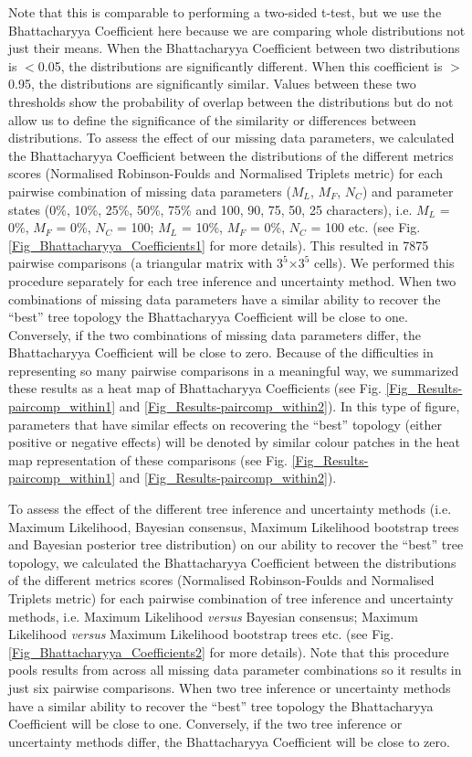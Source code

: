 Note that this is comparable to performing a two-sided t-test, but we use the Bhattacharyya Coefficient here because we are comparing whole distributions not just their means.
When the Bhattacharyya Coefficient between two distributions is $<$0.05, the distributions are significantly different.
When this coefficient is $>$0.95, the distributions are significantly similar.
Values between these two thresholds show the probability of overlap between the distributions but do not allow us to define the significance of the similarity or differences between distributions.
To assess the effect of our missing data parameters, we calculated the Bhattacharyya Coefficient between the distributions of the different metrics scores (Normalised Robinson-Foulds and Normalised Triplets metric) for each pairwise combination of missing data parameters ($M_{L}$, $M_{F}$, $N_{C}$) and parameter states (0\%, 10\%, 25\%, 50\%, 75\% and 100, 90, 75, 50, 25 characters), i.e. $M_{L}$ = 0\%, $M_{F}$ = 0\%, $N_{C}$ = 100; $M_{L}$ = 10\%, $M_{F}$ = 0\%, $N_{C}$ = 100 etc. (see Fig. \ref{Fig_Bhattacharyya_Coefficients1} for more details).
This resulted in 7875 pairwise comparisons (a triangular matrix with $3^5$$\times$$3^5$ cells).
We performed this procedure separately for each tree inference and uncertainty method.
When two combinations of missing data parameters have a similar ability to recover the ``best'' tree topology the Bhattacharyya Coefficient will be close to one.
Conversely, if the two combinations of missing data parameters differ, the Bhattacharyya Coefficient will be close to zero.
Because of the difficulties in representing so many pairwise comparisons in a meaningful way, we summarized these results as a heat map of Bhattacharyya Coefficients (see Fig. \ref{Fig_Results-paircomp_within1} and \ref{Fig_Results-paircomp_within2}).
In this type of figure, parameters that have similar effects on recovering the ``best'' topology (either positive or negative effects) will be denoted by similar colour patches in the heat map representation of these comparisons (see Fig. \ref{Fig_Results-paircomp_within1} and \ref{Fig_Results-paircomp_within2}).

To assess the effect of the different tree inference and uncertainty methods (i.e. Maximum Likelihood, Bayesian consensus, Maximum Likelihood bootstrap trees and Bayesian posterior tree distribution) on our ability to recover the ``best'' tree topology, we calculated the Bhattacharyya Coefficient between the distributions of the different metrics scores (Normalised Robinson-Foulds and Normalised Triplets metric) for each pairwise combination of tree inference and uncertainty methods, i.e. Maximum Likelihood \textit{versus} Bayesian consensus; Maximum Likelihood \textit{versus} Maximum Likelihood bootstrap trees etc. (see Fig. \ref{Fig_Bhattacharyya_Coefficients2} for more details).
Note that this procedure pools results from across all missing data parameter combinations so it results in just six pairwise comparisons.
When two tree inference or uncertainty methods have a similar ability to recover the ``best'' tree topology the Bhattacharyya Coefficient will be close to one.
Conversely, if the two tree inference or uncertainty methods differ, the Bhattacharyya Coefficient will be close to zero.

